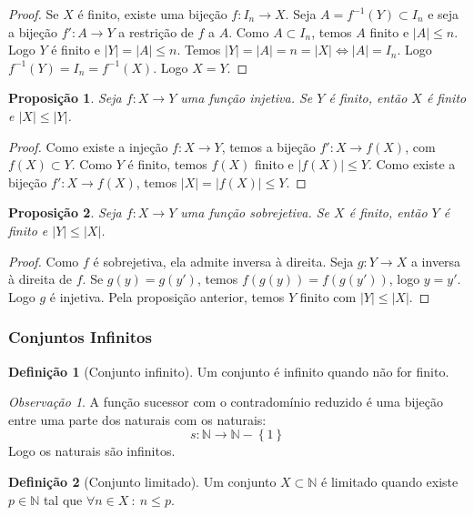 \documentclass{article}
\theoremstyle{plain}
\newtheorem{prop}{Proposição}[section]
\theoremstyle{definition}
\newtheorem{definicao}{Definição}[section]
\theoremstyle{remark}
\newtheorem{obs}{Observação}[section]
\begin{document}
\begin{proof}
	Se $X$ é finito, existe uma bijeção $f : I_n \to X$. Seja $A = f^{-1}(Y) \subset I_n$ e seja a bijeção $f': A \to Y$ a restrição de $f$ a $A$.  Como $A\subset I_n$, temos $A$ finito e $|A| \leq n$. Logo $Y$ é finito e  $|Y| = |A| \leq n$.  Temos $|Y| = |A| = n  = |X| \iff |A| = I_n$. Logo $f^{-1}(Y) = I_n = f^{-1}(X)$. Logo $X = Y$.
\end{proof}
\begin{prop}
	Seja $f:X\to Y$ uma função injetiva. Se $Y$ é finito, então $X$ é finito e $|X|\leq |Y|$.
\end{prop}
\begin{proof}
	Como existe a injeção $f: X\to Y$, temos a bijeção $f': X \to f(X)$,  com $f(X)\subset Y$. Como $Y$ é finito, temos $f(X)$ finito e  $|f(X)| \leq Y$. Como existe a bijeção $f':X\to f(X)$, temos $|X| = |f(X)| \leq Y$.
\end{proof}
\begin{prop}
	Seja $f:X\to Y$ uma função sobrejetiva. Se $X$ é finito, então $Y$ é finito e $|Y|\leq |X|$.
\end{prop}
\begin{proof}
	Como $f$ é sobrejetiva, ela admite inversa à direita. Seja $g: Y\to X$ a inversa à direita de $f$.  Se $g(y) = g(y')$, temos $f(g(y)) = f(g(y'))$, logo $y = y'$. Logo $g$ é injetiva. Pela proposição anterior, temos $Y$ finito com $|Y| \leq |X|$. 
\end{proof}
\subsubsection{Conjuntos Infinitos}
\begin{definicao}[Conjunto infinito]
	Um conjunto é infinito quando não for finito.
\end{definicao}
\begin{obs}
	A função sucessor com o contradomínio reduzido é uma bijeção entre uma parte dos naturais com os naturais:
	$$s: \mathbb{N} \to \mathbb{N} - \left\{1\right\}$$
	Logo os naturais são infinitos.
\end{obs}
\begin{definicao}[Conjunto limitado]
	Um conjunto $X\subset \mathbb{N}$ é limitado quando existe $p\in \mathbb{N}$ tal que $\forall n\in X \: : \: n \leq p$.
\end{definicao}

%
\end{document}
